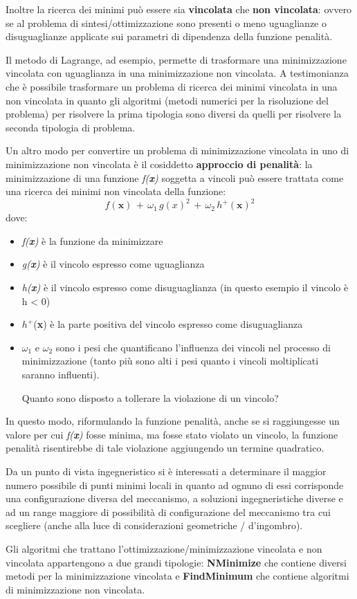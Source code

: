 Inoltre la ricerca dei minimi può essere sia \textbf{vincolata} che \textbf{non vincolata}: ovvero se al problema di sintesi/ottimizzazione sono presenti o meno uguaglianze o disuguaglianze applicate sui parametri di dipendenza della funzione penalità.

Il metodo di Lagrange, ad esempio, permette di trasformare una minimizzazione vincolata con uguaglianza in una minimizzazione non vincolata. A testimonianza che è possibile trasformare un problema di ricerca dei minimi vincolata in una non vincolata in quanto gli algoritmi (metodi numerici per la risoluzione del problema) per risolvere la prima tipologia sono diversi da quelli per risolvere la seconda tipologia di problema.

Un altro modo per convertire un problema di minimizzazione vincolata in uno di minimizzazione non vincolata è il cosiddetto \textbf{approccio di penalità}: la minimizzazione di una funzione \emph{f(\textbf{x})} soggetta a vincoli può essere trattata come una ricerca dei minimi non vincolata della funzione:
\[f(\mathbf{x})\,+\,\omega_1\,g(x)^2\,+\,\omega_2\,h^+(\mathbf{x})^2\]
dove:
\begin{itemize}
\item \emph{f(\textbf{x})} è la funzione da minimizzare
\item \emph{g(\textbf{x})} è il vincolo espresso come uguaglianza
\item \emph{h(\textbf{x})} è il vincolo espresso come disuguaglianza (in questo esempio il vincolo è h < 0)
\item $h^+$(\textbf{x}) è la parte positiva del vincolo espresso come disuguaglianza
\item $\omega_1$ e $\omega_2$ sono i pesi che quantificano l'influenza dei vincoli nel processo di minimizzazione (tanto più sono alti i pesi quanto i vincoli moltiplicati saranno influenti).

Quanto sono disposto a tollerare la violazione di un vincolo?
\end{itemize}

In questo modo, riformulando la funzione penalità, anche se si raggiungesse un valore per cui \emph{f(\textbf{x})} fosse minima, ma fosse stato violato un vincolo, la funzione penalità  risentirebbe di tale violazione aggiungendo un termine quadratico.

Da un punto di vista ingegneristico si è interessati a determinare il maggior numero possibile di punti minimi locali in quanto ad ognuno di essi corrisponde una configurazione diversa del meccanismo, a soluzioni ingegneristiche diverse e ad un range maggiore di possibilità di configurazione del meccanismo tra cui scegliere (anche alla luce di considerazioni geometriche / d'ingombro).

Gli algoritmi che trattano l'ottimizzazione/minimizzazione vincolata e non vincolata appartengono a due grandi tipologie: \textbf{NMinimize} che contiene diversi metodi per la minimizzazione vincolata e \textbf{FindMinimum} che contiene algoritmi di minimizzazione non vincolata.